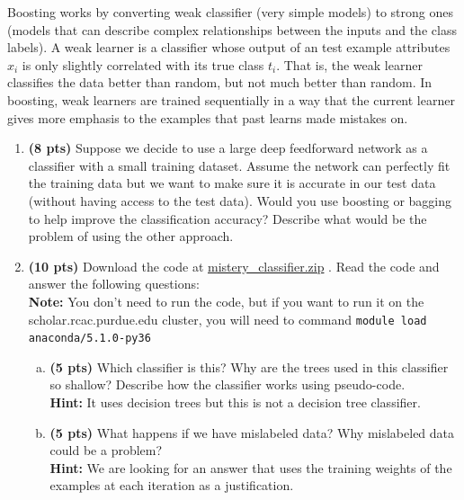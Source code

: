 \documentclass{article}
\begin{document}
Boosting works by converting weak classifier (very simple models) to strong ones (models that can describe complex relationships between the inputs and the class labels).
A weak learner is a classifier whose output of an test example attributes $x_i$ is only slightly correlated with its true class $t_i$. That is, the weak learner classifies the data better than random, but not much better than random.
In boosting, weak learners are trained sequentially in a way that the current learner gives more emphasis to the examples that past learns made mistakes on.

\begin{enumerate}[1.]
\item {\bf (8 pts)} Suppose we decide to use a large deep feedforward network as a classifier with a small training dataset. Assume the network can perfectly fit the training data but we want to make sure it is accurate in our test data (without having access to the test data). Would you use boosting or bagging to help improve the classification accuracy? Describe what would be the problem of using the other approach.
  \begin{tcolorbox}[breakable,
        enhanced,
        notitle,
        width=15.3cm,
        height=8cm]
%
%
        \end{tcolorbox}
        \newpage
\item {\bf (10 pts)} Download the code at \href{https://www.dropbox.com/s/swdrapsebhad6tb/mistery_classifier.zip?dl=0}{mistery\_classifier.zip} . Read the code and answer the following questions:\\
{\bf Note:}  You don't need to run the code, but if you want to run it on the scholar.rcac.purdue.edu cluster, you will need to command \texttt{module load anaconda/5.1.0-py36} \\
   \begin{enumerate}[(a)]
   \item {\bf (5 pts)} Which classifier is this? Why are the trees used in this classifier so shallow? Describe how the classifier works using pseudo-code. \\
   {\bf Hint:} It uses decision trees but this is not a decision tree classifier.
      \begin{tcolorbox}[breakable,
        enhanced,
        notitle,
        width=15cm,
        height=8cm]
%
%
        \end{tcolorbox}
   \item {\bf (5 pts)} What happens if we have mislabeled data? Why mislabeled data could be a problem?\\
   {\bf Hint:} We are looking for an answer that uses the training weights of the examples at each iteration as a justification.
         \begin{tcolorbox}[breakable,
        enhanced,
        notitle,
        width=15cm,
        height=6cm]
%
%
        \end{tcolorbox}
  \end{enumerate}
 
\end{enumerate}
\end{document}
